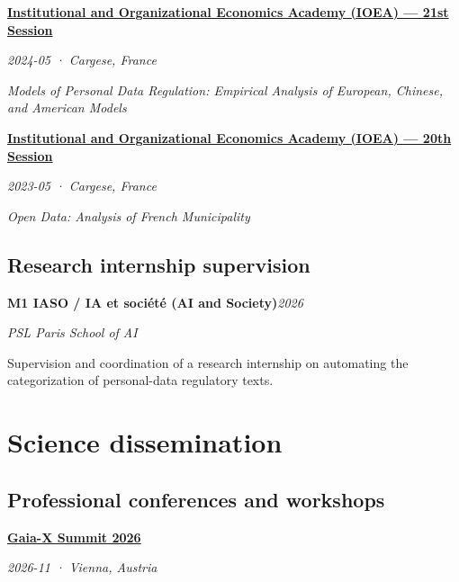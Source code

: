 \documentclass[11pt,a4paper]{article}
\newlength{\cvindent}
\let\cvoldsection\section
\renewcommand{\section}[1]{\Needspace{5\baselineskip}\cvoldsection{#1}}
\newenvironment{cvblock}[1][1]{%
  \par\noindent\hspace*{#1\cvindent}%
  \begin{minipage}{\dimexpr\linewidth-#1\cvindent\relax}%
}{%
  \end{minipage}\par
}
\newenvironment{cvdetails}{%
  \begin{list}{}{%
    \setlength{\leftmargin}{\cvindent}%
    \setlength{\rightmargin}{0pt}%
    \setlength{\topsep}{0.1em}%
    \setlength{\partopsep}{0pt}%
    \setlength{\parsep}{0.05em}%
    \setlength{\itemsep}{0pt}%
  }\item[]\small\ignorespaces
}{%
  \end{list}
}
\begin{document}
\begin{cvblock}[2]
\textbf{\href{https://www.ioea.eu/}{Institutional and Organizational Economics Academy (IOEA) --- 21st Session}}\par
\begin{cvdetails}
{\small\itshape 2024-05 · Cargese, France}\par
\textit{Models of Personal Data Regulation: Empirical Analysis of European, Chinese, and American Models}\par
\end{cvdetails}
\end{cvblock}\par\vspace{0.35em}

\begin{cvblock}[2]
\textbf{\href{https://www.ioea.eu/}{Institutional and Organizational Economics Academy (IOEA) --- 20th Session}}\par
\begin{cvdetails}
{\small\itshape 2023-05 · Cargese, France}\par
\textit{Open Data: Analysis of French Municipality}\par
\end{cvdetails}
\end{cvblock}\par\vspace{0.35em}

\subsection*{Research internship supervision}
\begin{cvblock}[2]
\textbf{M1 IASO / IA et société (AI and Society)}\hfill\textit{2026}\par
\begin{cvdetails}
{\small\itshape PSL Paris School of AI}\par
Supervision and coordination of a research internship on automating the categorization of personal-data regulatory texts.
\end{cvdetails}
\end{cvblock}\par

\section{Science dissemination}
\subsection*{Professional conferences and workshops}
\begin{cvblock}[2]
\textbf{\href{https://gaia-x.eu/summit-2026/}{Gaia-X Summit 2026}}\par
\begin{cvdetails}
{\small\itshape 2026-11 · Vienna, Austria}\par
\end{cvdetails}
\end{cvblock}\par\vspace{0.35em}
\end{document}
